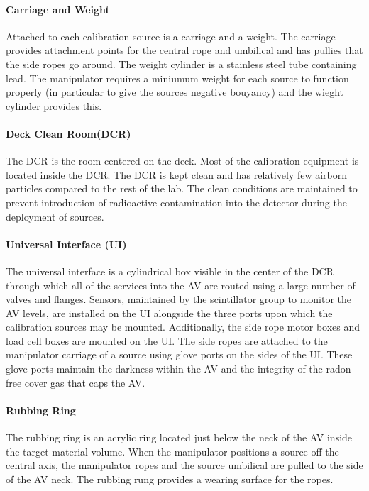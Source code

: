 \paragraph{Carriage and Weight}
Attached to each calibration source is a carriage and a weight. The
carriage provides attachment points for the central rope and umbilical
and has pullies that the side ropes go around. The weight cylinder is
a stainless steel tube containing lead. The manipulator requires a
miniumum weight for each source to function properly (in particular to
give the sources negative bouyancy) and the wieght cylinder provides
this.

\paragraph{Deck Clean Room(DCR)}
The DCR is the room centered on the deck. Most of the calibration
equipment is located inside the DCR. The DCR is kept clean and has
relatively few airborn particles compared to the rest of the lab. The
clean conditions are maintained to prevent introduction of radioactive
contamination into the detector during the deployment of sources.

\paragraph{Universal Interface (UI)}
The universal interface is a cylindrical box visible in the center of
the DCR through which all of the services into the AV are routed using
a large number of valves and flanges. Sensors, maintained by the
scintillator group to monitor the AV levels, are installed on the UI
alongside the three ports upon which the calibration sources may be
mounted. Additionally, the side rope motor boxes and load cell boxes
are mounted on the UI. The side ropes are attached to the manipulator
carriage of a source using glove ports on the sides of the UI. These
glove ports maintain the darkness within the AV and the integrity of
the radon free cover gas that caps the AV.

\paragraph{Rubbing Ring}
The rubbing ring is an acrylic ring located just below the neck of the
AV inside the target material volume. When the manipulator positions a
source off the central axis, the manipulator ropes and the source
umbilical are pulled to the side of the AV neck. The rubbing rung
provides a wearing surface for the ropes.

